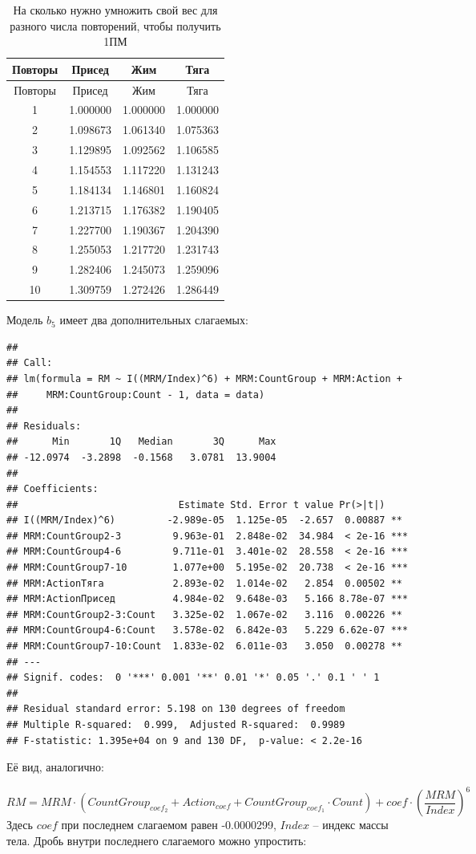 \documentclass[
]{article}
\begin{document}
\begin{longtable}[]{@{}cccc@{}}
\caption{На сколько нужно умножить свой вес для разного числа
повторений, чтобы получить 1ПМ}\tabularnewline
\toprule
Повторы & Присед & Жим & Тяга\tabularnewline
\midrule
\endfirsthead
\toprule
Повторы & Присед & Жим & Тяга\tabularnewline
\midrule
\endhead
1 & 1.000000 & 1.000000 & 1.000000\tabularnewline
2 & 1.098673 & 1.061340 & 1.075363\tabularnewline
3 & 1.129895 & 1.092562 & 1.106585\tabularnewline
4 & 1.154553 & 1.117220 & 1.131243\tabularnewline
5 & 1.184134 & 1.146801 & 1.160824\tabularnewline
6 & 1.213715 & 1.176382 & 1.190405\tabularnewline
7 & 1.227700 & 1.190367 & 1.204390\tabularnewline
8 & 1.255053 & 1.217720 & 1.231743\tabularnewline
9 & 1.282406 & 1.245073 & 1.259096\tabularnewline
10 & 1.309759 & 1.272426 & 1.286449\tabularnewline
\bottomrule
\end{longtable}

Модель \(b_5\) имеет два дополнительных слагаемых:

\begin{verbatim}
## 
## Call:
## lm(formula = RM ~ I((MRM/Index)^6) + MRM:CountGroup + MRM:Action + 
##     MRM:CountGroup:Count - 1, data = data)
## 
## Residuals:
##      Min       1Q   Median       3Q      Max 
## -12.0974  -3.2898  -0.1568   3.0781  13.9004 
## 
## Coefficients:
##                            Estimate Std. Error t value Pr(>|t|)    
## I((MRM/Index)^6)         -2.989e-05  1.125e-05  -2.657  0.00887 ** 
## MRM:CountGroup2-3         9.963e-01  2.848e-02  34.984  < 2e-16 ***
## MRM:CountGroup4-6         9.711e-01  3.401e-02  28.558  < 2e-16 ***
## MRM:CountGroup7-10        1.077e+00  5.195e-02  20.738  < 2e-16 ***
## MRM:ActionТяга            2.893e-02  1.014e-02   2.854  0.00502 ** 
## MRM:ActionПрисед          4.984e-02  9.648e-03   5.166 8.78e-07 ***
## MRM:CountGroup2-3:Count   3.325e-02  1.067e-02   3.116  0.00226 ** 
## MRM:CountGroup4-6:Count   3.578e-02  6.842e-03   5.229 6.62e-07 ***
## MRM:CountGroup7-10:Count  1.833e-02  6.011e-03   3.050  0.00278 ** 
## ---
## Signif. codes:  0 '***' 0.001 '**' 0.01 '*' 0.05 '.' 0.1 ' ' 1
## 
## Residual standard error: 5.198 on 130 degrees of freedom
## Multiple R-squared:  0.999,  Adjusted R-squared:  0.9989 
## F-statistic: 1.395e+04 on 9 and 130 DF,  p-value: < 2.2e-16
\end{verbatim}

Её вид, аналогично:

\[RM=MRM \cdot (CountGroup_{coef_2} +Action_{coef}+CountGroup_{coef_1} \cdot Count)+coef \cdot\left(\frac{MRM}{Index}\right)^6\]
Здесь \(coef\) при последнем слагаемом равен -0.0000299, \(Index\) --
индекс массы тела. Дробь внутри последнего слагаемого можно упростить:
\end{document}
